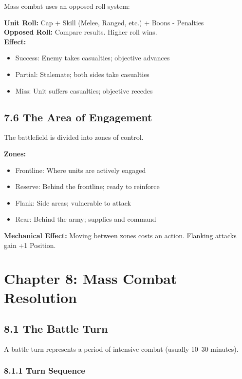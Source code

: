 \documentclass[11pt]{article}
\begin{document}
Mass combat uses an opposed roll system:

\textbf{Unit Roll:} Cap + Skill (Melee, Ranged, etc.) + Boons - Penalties\\
\textbf{Opposed Roll:} Compare results. Higher roll wins.\\

\textbf{Effect:}
\begin{itemize}
  \item Success: Enemy takes casualties; objective advances
  \item Partial: Stalemate; both sides take casualties
  \item Miss: Unit suffers casualties; objective recedes
\end{itemize}

\subsection{7.6 The Area of Engagement}

The battlefield is divided into zones of control.

\textbf{Zones:}
\begin{itemize}
  \item Frontline: Where units are actively engaged
  \item Reserve: Behind the frontline; ready to reinforce
  \item Flank: Side areas; vulnerable to attack
  \item Rear: Behind the army; supplies and command
\end{itemize}

\textbf{Mechanical Effect:} Moving between zones costs an action. Flanking attacks gain +1 Position.

\section{Chapter 8: Mass Combat Resolution}

\subsection{8.1 The Battle Turn}

A battle turn represents a period of intensive combat (usually 10–30 minutes).

\subsubsection{8.1.1 Turn Sequence}
\end{document}
